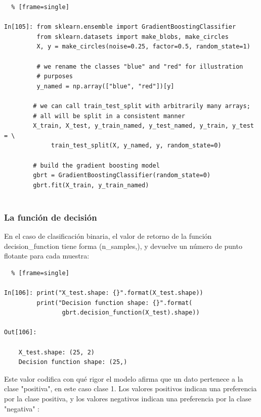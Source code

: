 {\begin{lstlisting}  % [frame=single]	

In[105]: from sklearn.ensemble import GradientBoostingClassifier
         from sklearn.datasets import make_blobs, make_circles
         X, y = make_circles(noise=0.25, factor=0.5, random_state=1)
   
         # we rename the classes "blue" and "red" for illustration 
         # purposes
         y_named = np.array(["blue", "red"])[y]
   
        # we can call train_test_split with arbitrarily many arrays;
        # all will be split in a consistent manner
        X_train, X_test, y_train_named, y_test_named, y_train, y_test = \
             train_test_split(X, y_named, y, random_state=0)
   
        # build the gradient boosting model
        gbrt = GradientBoostingClassifier(random_state=0)
        gbrt.fit(X_train, y_train_named)


\end{lstlisting} 




\subsubsection*{La función de decisión}

En el caso de clasificación binaria, el valor de retorno de la función   {\ttfamily decision\_function} tiene forma {\ttfamily (n\_samples,)}, y devuelve un número de punto flotante para cada muestra:\\

\begin{lstlisting}  % [frame=single]	

In[106]: print("X_test.shape: {}".format(X_test.shape))
         print("Decision function shape: {}".format(
                gbrt.decision_function(X_test).shape))

Out[106]:

    X_test.shape: (25, 2)
    Decision function shape: (25,)

\end{lstlisting} 


Este valor codifica con qué rigor  el modelo afirma  que un  dato pertenece a la
clase "positiva", en este caso clase 1. Los valores positivos indican una preferencia por la 
clase positiva, y los valores negativos indican una preferencia por la clase "negativa"{ }:\\

}
